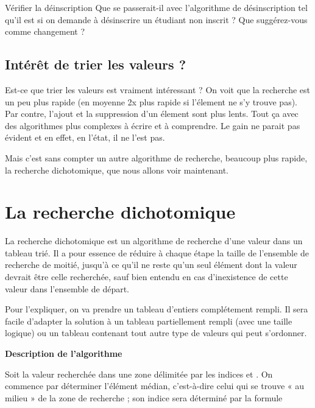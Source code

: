 			\begin{Exercice}{Vérifier la déinscription}
				Que se passerait-il avec l'algorithme
				de désinscription tel qu'il est
				si on demande à désinscrire un étudiant non inscrit ?
				Que suggérez-vous comme changement ?
			\end{Exercice}

		\subsection{Intérêt de trier les valeurs ?}

			Est-ce que trier les valeurs est vraiment intéressant ?
			On voit que la recherche est un peu plus rapide
			(en moyenne 2x plus rapide si l'élement ne s'y trouve pas).
			Par contre, l'ajout et la suppression d'un élement
			sont plus lents.
			Tout ça avec des algorithmes plus complexes à écrire
			et à comprendre.
			Le gain ne parait pas évident
			et en effet, en l'état, il ne l'est pas.
			
			Mais c'est sans compter 
			un autre algorithme de recherche, beaucoup plus rapide,
			la recherche dichotomique, que nous allons voir maintenant.
			
	\section{La recherche dichotomique} 

		La recherche dichotomique 
		est un algorithme de recherche d'une valeur dans un tableau trié.
		Il a pour essence de réduire à chaque étape 
		la taille de l’ensemble de recherche de moitié, 
		jusqu’à ce qu’il ne reste qu’un seul élément 
		dont la valeur devrait être celle recherchée, 
		sauf bien entendu en cas d’inexistence de cette valeur 
		dans l’ensemble de départ. 
	
		Pour l'expliquer,
		on va prendre un tableau d'entiers complétement rempli.
		Il sera facile d'adapter la solution à un tableau partiellement
		rempli (avec une taille logique) 
		ou un tableau contenant tout autre type de valeurs
		qui peut s'ordonner.
		
		{\sffamily\bfseries\upshape
		Description de l’algorithme}
	
		Soit  la valeur recherchée dans une zone délimitée 
		par les indices  et . 
		On commence par déterminer l’élément médian, 
		c’est-à-dire celui qui se trouve « au milieu » 
		de la zone de recherche ; 
		son indice sera déterminé par la formule
	
